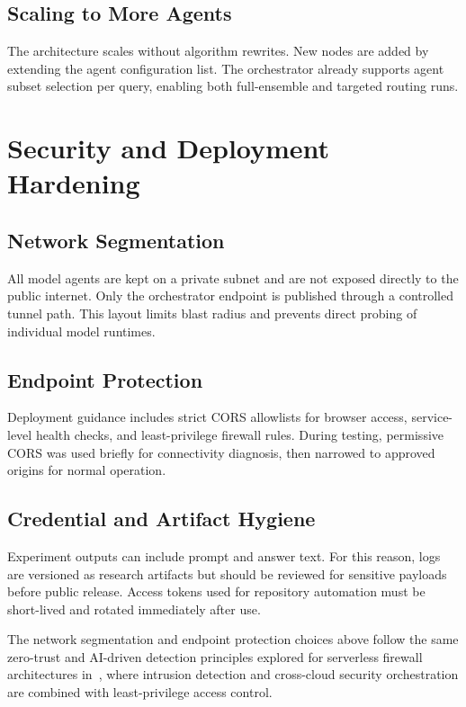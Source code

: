 \documentclass[conference]{IEEEtran}
\begin{document}
\subsection{Scaling to More Agents}
The architecture scales without algorithm rewrites. New nodes are added by extending the agent configuration list. The orchestrator already supports agent subset selection per query, enabling both full-ensemble and targeted routing runs.

\section{Security and Deployment Hardening}
\subsection{Network Segmentation}
All model agents are kept on a private subnet and are not exposed directly to the public internet. Only the orchestrator endpoint is published through a controlled tunnel path. This layout limits blast radius and prevents direct probing of individual model runtimes.

\subsection{Endpoint Protection}
Deployment guidance includes strict CORS allowlists for browser access, service-level health checks, and least-privilege firewall rules. During testing, permissive CORS was used briefly for connectivity diagnosis, then narrowed to approved origins for normal operation.

\subsection{Credential and Artifact Hygiene}
Experiment outputs can include prompt and answer text. For this reason, logs are versioned as research artifacts but should be reviewed for sensitive payloads before public release. Access tokens used for repository automation must be short-lived and rotated immediately after use.

The network segmentation and endpoint protection choices above follow the same zero-trust and AI-driven detection principles explored for serverless firewall architectures in~\cite{chowdhury2025serverless,chowdhury2026serverless}, where intrusion detection and cross-cloud security orchestration are combined with least-privilege access control.
\end{document}
